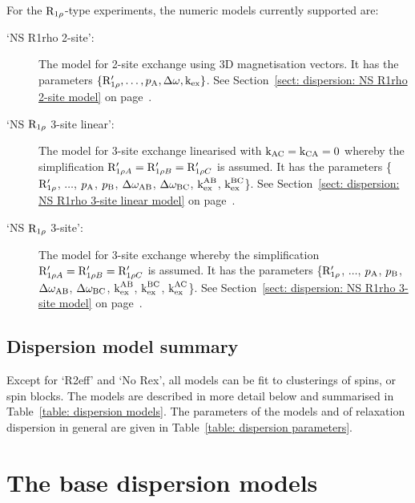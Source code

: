 For the $\mathrm{R}_{1\rho}$-type experiments, the numeric models currently supported are:
\begin{description}
  \item[`NS R1rho 2-site':]  The model for 2-site exchange using 3D magnetisation vectors.
    It has the parameters $\{\mathrm{R}_{1\rho}', \dots, p_{\textrm{A}}, \Delta\omega, \textrm{k}_{\textrm{ex}}\}$.
    See Section~\ref{sect: dispersion: NS R1rho 2-site model} on page~\pageref{sect: dispersion: NS R1rho 2-site model}.
  \item[`NS $\mathrm{R}_{1\rho}$ 3-site linear':]  The model for 3-site exchange linearised with $\textrm{k}_{\textrm{AC}}=\textrm{k}_{\textrm{CA}}=0$ whereby the simplification $\mathrm{R}_{1\rho A}' = \mathrm{R}_{1\rho B}' = \mathrm{R}_{1\rho C}'$ is assumed.
    It has the parameters \{$\mathrm{R}_{1\rho}'$, $\dots$, $p_{\textrm{A}}$, $p_{\textrm{B}}$, $\Delta\omega_{\textrm{AB}}$, $\Delta\omega_{\textrm{BC}}$, $\textrm{k}_{\textrm{ex}}^{\textrm{AB}}$, $\textrm{k}_{\textrm{ex}}^{\textrm{BC}}$\}.
    See Section~\ref{sect: dispersion: NS R1rho 3-site linear model} on page~\pageref{sect: dispersion: NS R1rho 3-site linear model}.
  \item[`NS $\mathrm{R}_{1\rho}$ 3-site':]  The model for 3-site exchange whereby the simplification $\mathrm{R}_{1\rho A}' = \mathrm{R}_{1\rho B}' = \mathrm{R}_{1\rho C}'$ is assumed.
    It has the parameters \{$\mathrm{R}_{1\rho}'$, $\dots$, $p_{\textrm{A}}$, $p_{\textrm{B}}$, $\Delta\omega_{\textrm{AB}}$, $\Delta\omega_{\textrm{BC}}$, $\textrm{k}_{\textrm{ex}}^{\textrm{AB}}$, $\textrm{k}_{\textrm{ex}}^{\textrm{BC}}$, $\textrm{k}_{\textrm{ex}}^{\textrm{AC}}$\}.
    See Section~\ref{sect: dispersion: NS R1rho 3-site model} on page~\pageref{sect: dispersion: NS R1rho 3-site model}.
\end{description}




\subsection{Dispersion model summary}

Except for `R2eff' and `No Rex', all models can be fit to clusterings of spins, or spin blocks.
The models are described in more detail below and summarised in Table~\ref{table: dispersion models}.
The parameters of the models and of relaxation dispersion in general are given in Table~\ref{table: dispersion parameters}.






\section{The base dispersion models}
\label{sect: dispersion: base models}


